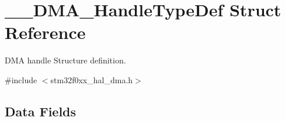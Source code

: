\hypertarget{struct_____d_m_a___handle_type_def}{}\section{\+\_\+\+\_\+\+D\+M\+A\+\_\+\+Handle\+Type\+Def Struct Reference}
\label{struct_____d_m_a___handle_type_def}


D\+MA handle Structure definition.  




{\ttfamily \#include $<$stm32f0xx\+\_\+hal\+\_\+dma.\+h$>$}

\subsection*{Data Fields}
